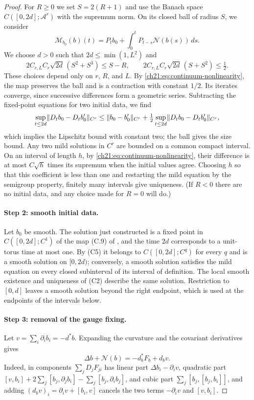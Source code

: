 \begin{proof}
For $R\ge0$ we set $S=2(R+1)$ and use the Banach space $C([0,2d];\mathcal A^r)$ with the supremum norm. On its closed ball of radius $S$, we consider
\[
 \mathscr M_{b_0}(b)(t)=P_tb_0+\int_0^tP_{t-s}\mathscr N(b(s))\,ds .
\]
We choose $d>0$ such that $2d\le\min(1,L^2)$ and
\begin{equation}\label{ch21:eq:continuum-lifespan-choice}
 2C_{r,L}C_r\sqrt{2d}\,(S^2+S^3)\le S-R,\qquad
 2C_{r,L}C_r\sqrt{2d}\,(S+S^2)\le\tfrac12 .
\end{equation}
These choices depend only on $r$, $R$, and $L$. By \eqref{ch21:eq:continuum-nonlinearity}, the map preserves the ball and is a contraction with constant $1/2$. Its iterates converge, since successive differences form a geometric series. Subtracting the fixed-point equations for two initial data, we find
\[
 \sup_{t\le2d}\lVert D_tb_0-D_tb_0'\rVert_{C^r}\le\lVert b_0-b_0'\rVert_{C^r}+\tfrac12\sup_{t\le2d}\lVert D_tb_0-D_tb_0'\rVert_{C^r},
\]
which implies the Lipschitz bound with constant two; the ball gives the size bound. Any two mild solutions in $C^r$ are bounded on a common compact interval. On an interval of length $h$, by \eqref{ch21:eq:continuum-nonlinearity}, their difference is at most $C\sqrt h$ times its supremum when the initial values agree. Choosing $h$ so that this coefficient is less than one and restarting the mild equation by the semigroup property, finitely many intervals give uniqueness. (If $R<0$ there are no initial data, and any choice made for $R=0$ will do.)

\paragraph{Step 2: smooth initial data.}
Let $b_0$ be smooth. The solution just constructed is a fixed point in $C([0,2d];C^1)$ of the map (C.9) of \cite[p.~58]{CCHeat2022v4}, and the time $2d$ corresponds to a unit-torus time at most one. By (C5) it belongs to $C([0,2d];C^q)$ for every $q$ and is a smooth solution on $[0,2d)$; conversely, a smooth solution satisfies the mild equation on every closed subinterval of its interval of definition. The local smooth existence and uniqueness of (C2) describe the same solution. Restriction to $[0,d]$ leaves a smooth solution beyond the right endpoint, which is used at the endpoints of the intervals below.

\paragraph{Step 3: removal of the gauge fixing.}
Let $v=\sum_i\partial_ib_i=-d^*b$. Expanding the curvature and the covariant derivatives gives
\begin{equation}\label{ch21:eq:continuum-damping-identity}
 \Delta b+\mathscr N(b)=-d_b^*F_b+d_bv .
\end{equation}
Indeed, in components $\sum_jD_jF_{ji}$ has linear part $\Delta b_i-\partial_iv$, quadratic part $[v,b_i]+2\sum_j[b_j,\partial_jb_i]-\sum_j[b_j,\partial_ib_j]$, and cubic part $\sum_j[b_j,[b_j,b_i]]$, and adding $(d_bv)_i=\partial_iv+[b_i,v]$ cancels the two terms $-\partial_iv$ and $[v,b_i]$.


\end{proof}
